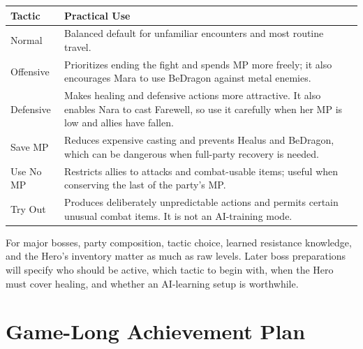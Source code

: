 \documentclass[
  american,
  10pt,
  letterpaper,
  oneside,
  open=any]{scrreprt}
\newcounter{none} %
\newenvironment{guidetable}{%
  \small\setstretch{1.0}%
  \setlength{\tabcolsep}{4pt}%
  \setlength{\LTpre}{8pt}\setlength{\LTpost}{10pt}%
  \renewcommand{\arraystretch}{1.16}%
}{ }
\begin{document}
\begin{guidetable}

{\def\LTcaptype{none} %
\begin{longtable}[]{@{}
  >{\raggedright\arraybackslash}p{}
  >{\raggedright\arraybackslash}p{}@{}}
\toprule\noalign{}
\begin{minipage}[b]{\linewidth}\raggedright
\color{GuideGreen}\bfseries Tactic
\end{minipage} & \begin{minipage}[b]{\linewidth}\raggedright
\color{GuideGreen}\bfseries Practical Use
\end{minipage} \\
\midrule\noalign{}
\endhead
\bottomrule\noalign{}
\endlastfoot
Normal & Balanced default for unfamiliar encounters and most routine
travel. \\
Offensive & Prioritizes ending the fight and spends MP more freely; it
also encourages Mara to use BeDragon against metal enemies. \\
Defensive & Makes healing and defensive actions more attractive. It also
enables Nara to cast Farewell, so use it carefully when her MP is low
and allies have fallen. \\
Save MP & Reduces expensive casting and prevents Healus and BeDragon,
which can be dangerous when full-party recovery is needed. \\
Use No MP & Restricts allies to attacks and combat-usable items; useful
when conserving the last of the party's MP. \\
Try Out & Produces deliberately unpredictable actions and permits
certain unusual combat items. It is not an AI-training mode. \\
\end{longtable}
}

\end{guidetable}

For major bosses, party composition, tactic choice, learned resistance
knowledge, and the Hero's inventory matter as much as raw levels. Later
boss preparations will specify who should be active, which tactic to
begin with, when the Hero must cover healing, and whether an AI-learning
setup is worthwhile.

\section{Game-Long Achievement Plan}\label{game-long-achievement-plan}
\end{document}
